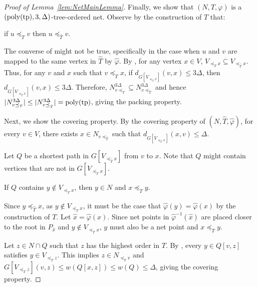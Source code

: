 \documentclass{article}
\newcommand{\tp}{{\rm tp}}
\newcommand{\poly}{\mathrm{poly}}
\begin{document}
\begin{proof}[Proof of Lemma~\ref{lem:NetMainLemma}]
Finally, we show that $(N,T,\varphi)$ is a $(\poly(\tp),3,\Delta)$-tree-ordered net. Observe by the construction of $T$ that:

\begin{observation}\label{obs:T-order} if $u\preceq_T v$ then $u\preceq_{\hat{T}}v$.
\end{observation}

The converse of  might not be true, specifically in the case when $u$ and $v$ are mapped to the same vertex in $\hat{T}$ by $\hat{\varphi}$.  By , for any vertex $x \in V$, $V_{\preceq_T x}\subseteq V_{\preceq_{\hat{T}}x}$. Thus, for any $v$ and $x$ such that $v\preceq_{T}x$, if  $d_{G[V_{\preceq_{T} x}]}(v,x) \leq 3\Delta$, then $d_{G[V_{\preceq_{\hat{T}} x}]}(v,x) \leq 3\Delta$. Therefore, $N^{3\Delta}_{v\preceq_T }\subseteq N^{3\Delta}_{v\preceq_{\hat{T}}}$ and hence $|N^{3\Delta}_{v\preceq_T }| \leq | N^{3\Delta}_{v\preceq_{\hat{T}}}| = \poly(\tp)$, giving the packing property.

Next, we show the covering property. By the covering property of $(N,\hat{T},\hat{\varphi})$, for every $v\in V$, there exists $x\in N_{v\preceq_{\hat{T}}}$ such that $d_{G[V_{\preceq_{\hat{T}} x}]}(x,v)\leq \Delta$.

Let $Q$ be a shortest path in $G[V_{\preceq_{\hat{T}} x}]$ from $v$ to $x$. Note that $Q$ might contain vertices that are not in  $G[V_{\preceq_{T} x}]$. 

\begin{claim}\label{clm:net-close} If $Q$ contains $y \not\in V_{\preceq_{T} x}$, then $y \in N$ and $x\preceq_T y$.
\end{claim}
\begin{subproof}
    Since $y \preceq_{\hat{T}}x$, as $y \not\in V_{\preceq_{T} x}$, it must be the case that $\hat{\varphi}(y) = \hat{\varphi}(x)$ by the construction of $T$. Let $\hat{x} = \hat{\varphi}(x)$. Since net points in $\hat{\varphi}^{-1}(\hat{x})$ are placed closer to the root in $P_{\hat{x}}$ and $y\not\in V_{\preceq_{T} x}$, $y$ must also be a net point and $x\preceq_T y$.
\end{subproof}

Let $z \in N\cap Q$ such that $z$ has the highest order in $T$. By  , every $y \in Q[v,z]$ satisfies $y \in  V_{\preceq_{T} z} $. This implies $z\in N_{\preceq_T v}$  and $G[V_{\preceq_{T} z}](v,z) \leq w(Q[x,z])\leq w(Q) \leq \Delta$, giving the covering property. 
\end{proof}
\end{document}
